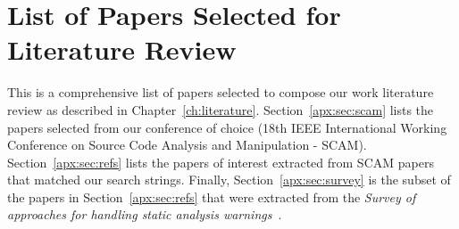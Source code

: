 \chapter{List of Papers Selected for Literature Review}
\label{apx:literature}

This is a comprehensive list of papers selected to compose our work literature
review as described in Chapter~\ref{ch:literature}. Section~\ref{apx:sec:scam} lists the
papers selected from our conference of choice (18th IEEE International Working
Conference on Source Code Analysis and Manipulation - SCAM).
Section~\ref{apx:sec:refs} lists the papers of interest extracted from SCAM papers
that matched our search strings. Finally, Section~\ref{apx:sec:survey} is the subset
of the papers in Section~\ref{apx:sec:refs} that were extracted from the \textit{Survey of
approaches for handling static analysis warnings}~\cite{muske2016survey}.

